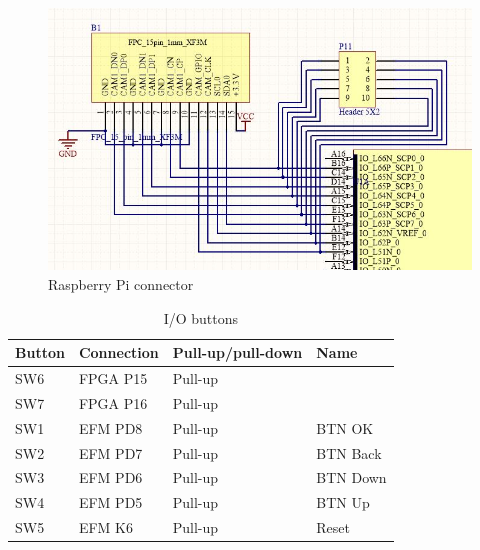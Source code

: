 \begin{figure}
    \includegraphics[width=\linewidth]{img/fpc_header.jpg}
    \caption{Raspberry Pi connector}
    \label{fig:FpcHeader}
\end{figure}

\begin{table}[]
    \centering
    \begin{tabular}{llll}
        Button & Connection & Pull-up/pull-down & Name     \\
        \hline
        SW6    & FPGA P15   & Pull-up          &          \\
        SW7    & FPGA P16   & Pull-up          &          \\
        SW1    & EFM PD8    & Pull-up          & BTN OK   \\
        SW2    & EFM PD7    & Pull-up          & BTN Back \\
        SW3    & EFM PD6    & Pull-up          & BTN Down \\
        SW4    & EFM PD5    & Pull-up          & BTN Up   \\
        SW5    & EFM K6     & Pull-up          & Reset
    \end{tabular}
    \caption{I/O buttons}
    \label{tab:Buttons}
\end{table}


